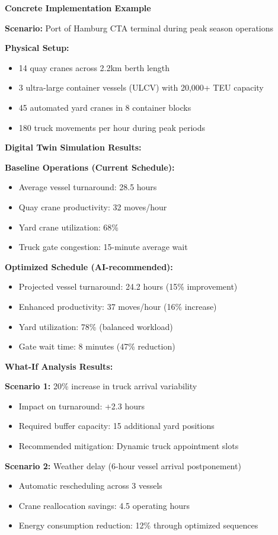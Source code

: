 \documentclass{article}
\begin{document}
\textbf{Concrete Implementation Example}

\textbf{Scenario:} Port of Hamburg CTA terminal during peak season operations

\textbf{Physical Setup:}
\begin{itemize}
\item 14 quay cranes across 2.2km berth length
\item 3 ultra-large container vessels (ULCV) with 20,000+ TEU capacity
\item 45 automated yard cranes in 8 container blocks  
\item 180 truck movements per hour during peak periods
\end{itemize}

\textbf{Digital Twin Simulation Results:}

\textbf{Baseline Operations (Current Schedule):}
\begin{itemize}
\item Average vessel turnaround: 28.5 hours
\item Quay crane productivity: 32 moves/hour
\item Yard crane utilization: 68\%
\item Truck gate congestion: 15-minute average wait
\end{itemize}

\textbf{Optimized Schedule (AI-recommended):}
\begin{itemize}
\item Projected vessel turnaround: 24.2 hours (15\% improvement)
\item Enhanced productivity: 37 moves/hour (16\% increase)  
\item Yard utilization: 78\% (balanced workload)
\item Gate wait time: 8 minutes (47\% reduction)
\end{itemize}

\textbf{What-If Analysis Results:}

\textbf{Scenario 1:} 20\% increase in truck arrival variability
\begin{itemize}
\item Impact on turnaround: +2.3 hours
\item Required buffer capacity: 15 additional yard positions
\item Recommended mitigation: Dynamic truck appointment slots
\end{itemize}

\textbf{Scenario 2:} Weather delay (6-hour vessel arrival postponement)
\begin{itemize}
\item Automatic rescheduling across 3 vessels
\item Crane reallocation savings: 4.5 operating hours
\item Energy consumption reduction: 12\% through optimized sequences
\end{itemize}
\end{document}
